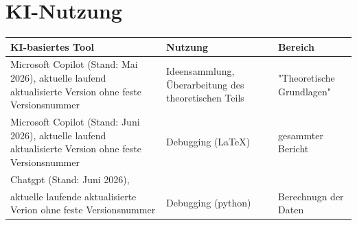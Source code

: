 \chapter{KI-Nutzung}


\begin{table}[h!]
\centering
\begin{tabular}{|p{5cm}|p{3cm}|p{3cm}|}
\hline
\textbf{KI-basiertes Tool} & \textbf{Nutzung} & \textbf{Bereich} \\
\hline
Microsoft Copilot (Stand: Mai 2026), aktuelle laufend aktualisierte Version ohne feste Versionsnummer 
& Ideensammlung, Überarbeitung des theoretischen Teils 
& "Theoretische Grundlagen" \\
\hline
Microsoft Copilot (Stand: Juni 2026), aktuelle laufend aktualisierte Version ohne feste Versionsnummer 
& Debugging (LaTeX) & gesammter Bericht \\
\hline
Chatgpt (Stand: Juni 2026),\\
aktuelle laufende aktualisierte Verion ohne feste Versionsnummer&Debugging (python) & Berechnugn der Daten\\
\hline
\end{tabular}
\end{table}
